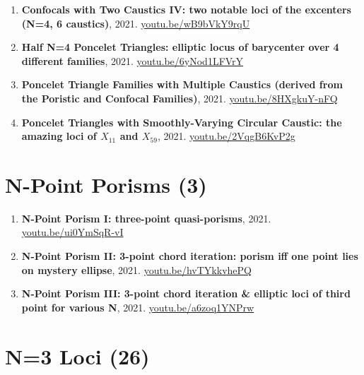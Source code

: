 \documentclass[12pt]{article}
\begin{document}
\begin{enumerate}[resume]
\item \textbf{Confocals with Two Caustics IV: two notable loci of the excenters (N=4, 6 caustics)}, 2021. \href{https://youtu.be/wB9bVkY9rqU}{\url{youtu.be/wB9bVkY9rqU}}
\item \textbf{Half N=4 Poncelet Triangles: elliptic locus of barycenter over 4 different families}, 2021. \href{https://youtu.be/6yNod1LFVrY}{\url{youtu.be/6yNod1LFVrY}}
\item \textbf{Poncelet Triangle Families with Multiple Caustics (derived from the Poristic and Confocal Families)}, 2021. \href{https://youtu.be/8HXgkuY-nFQ}{\url{youtu.be/8HXgkuY-nFQ}}
\item \textbf{Poncelet Triangles with Smoothly-Varying Circular Caustic: the amazing loci of $X_{11}$ and $X_{59}$}, 2021. \href{https://youtu.be/2VqgB6KvP2g}{\url{youtu.be/2VqgB6KvP2g}}
\end{enumerate}

\section{N-Point Porisms (3)}

\begin{enumerate}[resume]
\item \textbf{N-Point Porism I: three-point quasi-porisms}, 2021. \href{https://youtu.be/ui0YmSqR-vI}{\url{youtu.be/ui0YmSqR-vI}}
\item \textbf{N-Point Porism II: 3-point chord iteration: porism iff one point lies on mystery ellipse}, 2021. \href{https://youtu.be/hvTYkkvhePQ}{\url{youtu.be/hvTYkkvhePQ}}
\item \textbf{N-Point Porism III: 3-point chord iteration \& elliptic loci of third point for various N}, 2021. \href{https://youtu.be/a6zoq1YNPrw}{\url{youtu.be/a6zoq1YNPrw}}
\end{enumerate}

\section{N=3 Loci (26)}
\end{document}
